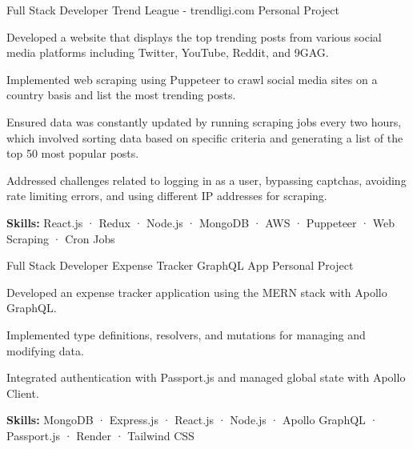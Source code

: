 

\begin{cventries}

  \cventry
  {Full Stack Developer} %
  {Trend League - trendligi.com} %
  {Personal Project} %
  {}
  {
    \begin{cvitems} %
      \item {Developed a website that displays the top trending posts from various social media platforms including Twitter, YouTube, Reddit, and 9GAG.}
      \item {Implemented web scraping using Puppeteer to crawl social media sites on a country basis and list the most trending posts.}
      \item {Ensured data was constantly updated by running scraping jobs every two hours, which involved sorting data based on specific criteria and generating a list of the top 50 most popular posts.}
      \item {Addressed challenges related to logging in as a user, bypassing captchas, avoiding rate limiting errors, and using different IP addresses for scraping.}
      \item {\textbf {Skills:} React.js · Redux · Node.js · MongoDB · AWS · Puppeteer · Web Scraping · Cron Jobs}
    \end{cvitems}
  }

  \cventry
    {Full Stack Developer} %
    {Expense Tracker GraphQL App} %
    {Personal Project} %
    {}
    {
      \begin{cvitems} %
        \item {Developed an expense tracker application using the MERN stack with Apollo GraphQL.}
        \item {Implemented type definitions, resolvers, and mutations for managing and modifying data.}
        \item {Integrated authentication with Passport.js and managed global state with Apollo Client.}
        \item {\textbf {Skills:} MongoDB · Express.js · React.js · Node.js · Apollo GraphQL · Passport.js · Render · Tailwind CSS}
      \end{cvitems}
    }


\end{cventries}
